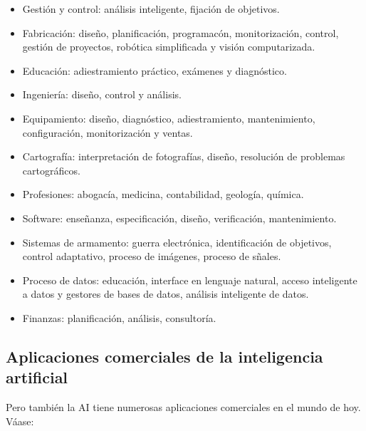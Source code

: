\begin{itemize}
\item Gesti\'on y control: an\'alisis inteligente, fijaci\'on de objetivos.
\item Fabricaci\'on: dise\~no, planificaci\'on, programac\'on, monitorizaci\'on, control, gesti\'on de proyectos, rob\'otica simplificada y visi\'on computarizada.
\item Educaci\'on: adiestramiento práctico, ex\'amenes y diagn\'ostico.
\item Ingenier\'ia: dise\~no, control y an\'alisis.
\item Equipamiento: dise\~no, diagn\'ostico, adiestramiento, mantenimiento, configuraci\'on, monitorizaci\'on y ventas.
\item Cartograf\'ia: interpretaci\'on de fotograf\'ias, dise\~no, resoluci\'on de problemas cartogr\'aficos.
\item Profesiones: abogac\'ia, medicina, contabilidad, geología, qu\'imica.
\item Software: ense\~nanza, especificaci\'on, diseño, verificaci\'on, mantenimiento.
\item Sistemas de armamento: guerra electr\'onica, identificaci\'on de objetivos, control adaptativo, proceso de im\'agenes, proceso de s\~nales.
\item Proceso de datos: educaci\'on, interface en lenguaje natural, acceso inteligente a datos y gestores de bases de datos, an\'alisis inteligente de datos.
\item Finanzas: planificaci\'on, an\'alisis, consultor\'ia. 
\end{itemize}

\subsection{Aplicaciones comerciales de la inteligencia artificial}

Pero también la AI tiene numerosas aplicaciones comerciales en el mundo de hoy. V\'aase:

